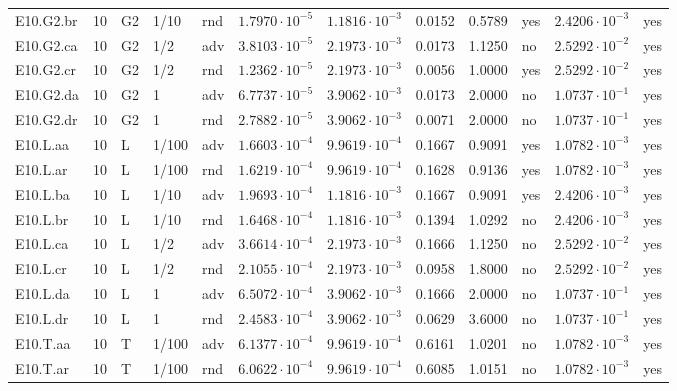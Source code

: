 {\begin{longtable}{@{}lllllllllll l@{}}
E10.G2.br & 10 & G2 & 1/10 & rnd & $1.7970\cdot 10^{-5}$ & $1.1816\cdot 10^{-3}$ & 0.0152 & 0.5789 & yes & $2.4206\cdot 10^{-3}$ & yes \\
E10.G2.ca & 10 & G2 & 1/2 & adv & $3.8103\cdot 10^{-5}$ & $2.1973\cdot 10^{-3}$ & 0.0173 & 1.1250 & no & $2.5292\cdot 10^{-2}$ & yes \\
E10.G2.cr & 10 & G2 & 1/2 & rnd & $1.2362\cdot 10^{-5}$ & $2.1973\cdot 10^{-3}$ & 0.0056 & 1.0000 & yes & $2.5292\cdot 10^{-2}$ & yes \\
E10.G2.da & 10 & G2 & 1 & adv & $6.7737\cdot 10^{-5}$ & $3.9062\cdot 10^{-3}$ & 0.0173 & 2.0000 & no & $1.0737\cdot 10^{-1}$ & yes \\
E10.G2.dr & 10 & G2 & 1 & rnd & $2.7882\cdot 10^{-5}$ & $3.9062\cdot 10^{-3}$ & 0.0071 & 2.0000 & no & $1.0737\cdot 10^{-1}$ & yes \\
E10.L.aa & 10 & L & 1/100 & adv & $1.6603\cdot 10^{-4}$ & $9.9619\cdot 10^{-4}$ & 0.1667 & 0.9091 & yes & $1.0782\cdot 10^{-3}$ & yes \\
E10.L.ar & 10 & L & 1/100 & rnd & $1.6219\cdot 10^{-4}$ & $9.9619\cdot 10^{-4}$ & 0.1628 & 0.9136 & yes & $1.0782\cdot 10^{-3}$ & yes \\
E10.L.ba & 10 & L & 1/10 & adv & $1.9693\cdot 10^{-4}$ & $1.1816\cdot 10^{-3}$ & 0.1667 & 0.9091 & yes & $2.4206\cdot 10^{-3}$ & yes \\
E10.L.br & 10 & L & 1/10 & rnd & $1.6468\cdot 10^{-4}$ & $1.1816\cdot 10^{-3}$ & 0.1394 & 1.0292 & no & $2.4206\cdot 10^{-3}$ & yes \\
E10.L.ca & 10 & L & 1/2 & adv & $3.6614\cdot 10^{-4}$ & $2.1973\cdot 10^{-3}$ & 0.1666 & 1.1250 & no & $2.5292\cdot 10^{-2}$ & yes \\
E10.L.cr & 10 & L & 1/2 & rnd & $2.1055\cdot 10^{-4}$ & $2.1973\cdot 10^{-3}$ & 0.0958 & 1.8000 & no & $2.5292\cdot 10^{-2}$ & yes \\
E10.L.da & 10 & L & 1 & adv & $6.5072\cdot 10^{-4}$ & $3.9062\cdot 10^{-3}$ & 0.1666 & 2.0000 & no & $1.0737\cdot 10^{-1}$ & yes \\
E10.L.dr & 10 & L & 1 & rnd & $2.4583\cdot 10^{-4}$ & $3.9062\cdot 10^{-3}$ & 0.0629 & 3.6000 & no & $1.0737\cdot 10^{-1}$ & yes \\
E10.T.aa & 10 & T & 1/100 & adv & $6.1377\cdot 10^{-4}$ & $9.9619\cdot 10^{-4}$ & 0.6161 & 1.0201 & no & $1.0782\cdot 10^{-3}$ & yes \\
E10.T.ar & 10 & T & 1/100 & rnd & $6.0622\cdot 10^{-4}$ & $9.9619\cdot 10^{-4}$ & 0.6085 & 1.0151 & no & $1.0782\cdot 10^{-3}$ & yes \\

\end{longtable}}
